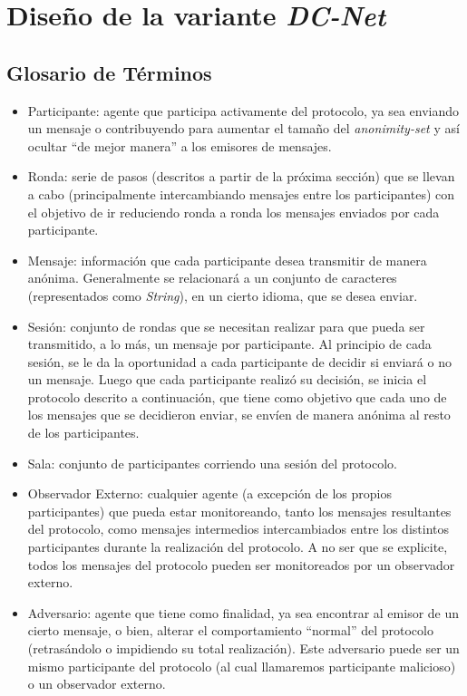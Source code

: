 \chapter{Diseño de la variante \emph{DC-Net}}

\section{Glosario de Términos}

\begin{itemize}
    \item Participante: agente que participa activamente del protocolo, ya sea 
    enviando un mensaje o contribuyendo para aumentar el tamaño del 
    \emph{anonimity-set} y así ocultar ``de mejor manera'' a los emisores de 
    mensajes. 
    \item Ronda: serie de pasos (descritos a partir de la próxima sección) que 
    se llevan a cabo (principalmente intercambiando mensajes entre los 
    participantes) con el objetivo de ir reduciendo ronda a ronda los mensajes 
    enviados por cada participante.  
    \item Mensaje: información que cada participante desea transmitir de 
    manera anónima. Generalmente se relacionará a un conjunto de caracteres 
    (representados como \emph{String}), en un cierto idioma, que se desea 
    enviar.
    \item Sesión: conjunto de rondas que se necesitan realizar para que pueda 
    ser transmitido, a lo más, un mensaje por participante. Al principio de 
    cada sesión, se le da la oportunidad a cada participante de decidir si 
    enviará o no un mensaje. Luego que cada participante realizó su decisión, 
    se inicia el protocolo descrito a continuación, que tiene como objetivo 
    que cada uno de los mensajes que se decidieron enviar, se envíen de manera 
    anónima al resto de los participantes.
    \item Sala: conjunto de participantes corriendo una sesión del protocolo.
    \item Observador Externo: cualquier agente (a excepción de los propios 
    participantes) que pueda estar monitoreando, tanto los mensajes 
    resultantes del protocolo, como mensajes intermedios intercambiados entre 
    los distintos participantes durante la realización del protocolo. A no ser 
    que se explicite, todos los mensajes del protocolo pueden ser monitoreados 
    por un observador externo.
    \item Adversario: agente que tiene como finalidad, ya sea encontrar al 
    emisor de un cierto mensaje, o bien, alterar el comportamiento ``normal'' 
    del protocolo (retrasándolo o impidiendo su total realización). Este 
    adversario puede ser un mismo participante del protocolo (al cual 
    llamaremos participante malicioso) o un observador externo.
\end{itemize}

